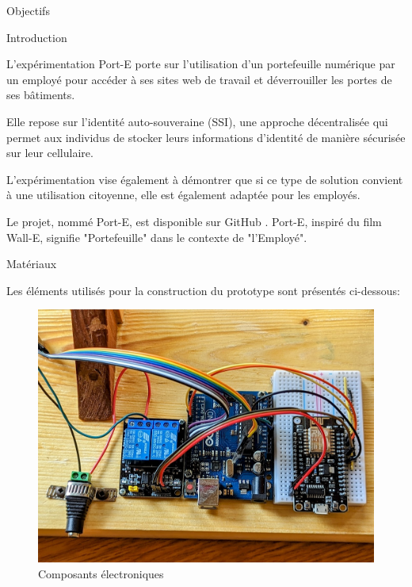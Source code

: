 \documentclass[final]{beamer}
\newlength{\onecolwid}
\begin{document}
\begin{frame}[t]
\begin{columns}[t]
\begin{column}{\onecolwid}
\begin{alertblock}{Objectifs}
\end{alertblock}


\begin{block}{Introduction}

L'expérimentation Port-E porte sur l'utilisation d'un portefeuille numérique par un employé pour accéder à ses sites web de travail et déverrouiller les portes de ses bâtiments. 

Elle repose sur l'identité auto-souveraine (SSI), une approche décentralisée qui permet aux individus de stocker leurs informations d'identité de manière sécurisée sur leur cellulaire. 

L'expérimentation vise également à démontrer que si ce type de solution convient à une utilisation citoyenne, elle est également adaptée pour les employés. 


Le projet, nommé Port-E, est disponible sur GitHub \cite{githubcqen:exp-mdl1}. Port-E, inspiré du film Wall-E, signifie "Portefeuille" dans le contexte de "l’Employé".

\end{block}


\begin{block}{Matériaux}

Les éléments utilisés pour la construction du prototype sont présentés ci-dessous:

\begin{figure}
\includegraphics[width=0.8\linewidth]{Port-E_door05.jpg}
\caption{ Composants électroniques}
\end{figure}


\end{block}
\end{column}
\end{columns}
\end{frame}
\end{document}
